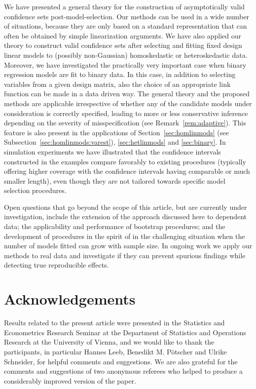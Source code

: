 \documentclass[preprint]{imsart}
\numberwithin{equation}{section}
\begin{document}
We have presented a general theory for the construction of asymptotically valid confidence sets post-model-selection. Our methods can be used in a wide number of situations, because they are only based on a standard representation that can often be obtained by simple linearization arguments. We have also applied our theory to construct valid confidence sets after selecting and fitting fixed design linear models to (possibly non-Gaussian) homoskedastic or heteroskedastic data. Moreover, we have investigated the practically very important case when binary regression models are fit to binary data. In this case, in addition to selecting variables from a given design matrix, also the choice of an appropriate link function can be made in a data driven way. The general theory and the proposed methods are applicable irrespective of whether any of the candidate models under consideration is correctly specified, leading to more or less conservative inference depending on the severity of misspecification (see Remark~\ref{rem:adaptive}). This feature is also present in the applications of Section~\ref{sec:homlinmods} (see Subsection~\ref{sec:homlinmods:varest}), \ref{sec:hetlinmods} and \ref{sec:binary}. In simulation experiments we have illustrated that the confidence intervals constructed in the examples compare favorably to existing procedures (typically offering higher coverage with the confidence intervals having comparable or much smaller length), even though they are not tailored towards specific model selection procedures.

Open questions that go beyond the scope of this article, but are currently under investigation, include the extension of the approach discussed here to dependent data; the applicability and performance of bootstrap procedures; and the development of procedures in the spirit of \cite{Berk13} in the challenging situation when the number of models fitted can grow with sample size. In ongoing work we apply our methods to real data and investigate if they can prevent spurious findings while detecting true reproducible effects.

\section*{Acknowledgements}

Results related to the present article were presented in the Statistics and Econometrics Research Seminar at the Department of Statistics and Operations Research at the University of Vienna, and we would like to thank the participants, in particular Hannes Leeb, Benedikt M. P\"otscher and Ulrike Schneider, for helpful comments and suggestions. We are also grateful for the comments and suggestions of two anonymous referees who helped to produce a considerably improved version of the paper.
\end{document}
